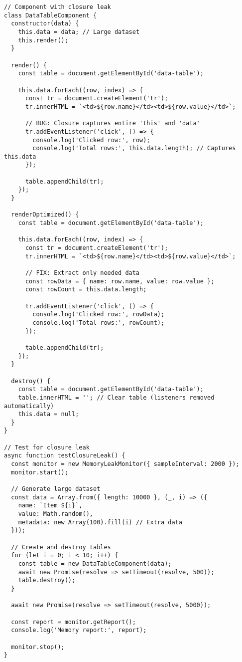 \documentclass[11pt]{article}
\begin{document}
\begin{verbatim}
// Component with closure leak
class DataTableComponent {
  constructor(data) {
    this.data = data; // Large dataset
    this.render();
  }
  
  render() {
    const table = document.getElementById('data-table');
    
    this.data.forEach((row, index) => {
      const tr = document.createElement('tr');
      tr.innerHTML = `<td>${row.name}</td><td>${row.value}</td>`;
      
      // BUG: Closure captures entire 'this' and 'data'
      tr.addEventListener('click', () => {
        console.log('Clicked row:', row);
        console.log('Total rows:', this.data.length); // Captures this.data
      });
      
      table.appendChild(tr);
    });
  }
  
  renderOptimized() {
    const table = document.getElementById('data-table');
    
    this.data.forEach((row, index) => {
      const tr = document.createElement('tr');
      tr.innerHTML = `<td>${row.name}</td><td>${row.value}</td>`;
      
      // FIX: Extract only needed data
      const rowData = { name: row.name, value: row.value };
      const rowCount = this.data.length;
      
      tr.addEventListener('click', () => {
        console.log('Clicked row:', rowData);
        console.log('Total rows:', rowCount);
      });
      
      table.appendChild(tr);
    });
  }
  
  destroy() {
    const table = document.getElementById('data-table');
    table.innerHTML = ''; // Clear table (listeners removed automatically)
    this.data = null;
  }
}

// Test for closure leak
async function testClosureLeak() {
  const monitor = new MemoryLeakMonitor({ sampleInterval: 2000 });
  monitor.start();
  
  // Generate large dataset
  const data = Array.from({ length: 10000 }, (_, i) => ({
    name: `Item ${i}`,
    value: Math.random(),
    metadata: new Array(100).fill(i) // Extra data
  }));
  
  // Create and destroy tables
  for (let i = 0; i < 10; i++) {
    const table = new DataTableComponent(data);
    await new Promise(resolve => setTimeout(resolve, 500));
    table.destroy();
  }
  
  await new Promise(resolve => setTimeout(resolve, 5000));
  
  const report = monitor.getReport();
  console.log('Memory report:', report);
  
  monitor.stop();
}
\end{verbatim}
\end{document}
